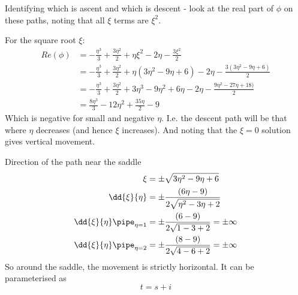 \documentclass{X:/Documents/Coding/Latex/myassignment}
\begin{document}
\begin{enumerate}
\begin{enumerate}
		Identifying which is ascent and which is descent - look at the real part of $\phi$ on these paths, noting that all $\xi$ terms are $\xi^2$. 

		For the square root $\xi$:
		\begin{align*}
			Re(\phi) &= -\frac{\eta ^3}{3}+\frac{3\eta ^2}{2}+\eta\xi^2-2\eta -\frac{3\xi ^2}{2}\\
			&=-\frac{\eta^3}{3} + \frac{3\eta^2}{2} + \eta\left(3\eta^2-9\eta + 6\right) - 2\eta - \frac{3(3\eta^2-9\eta + 6)}{2}\\
			&=-\frac{\eta^3}{3} + \frac{3\eta^2}{2} + 3\eta^3-9\eta^2 + 6\eta - 2\eta - \frac{9\eta^2-27\eta + 18)}{2}\\
			&=\frac{8\eta^3}{3} - 12\eta^2 + \frac{35\eta}{2} - 9
		\end{align*}
		Which is negative for small and negative $\eta$. I.e. the descent path will be that where $\eta$ decreases (and hence $\xi$ increases). 
		And noting that the $\xi = 0$ solution gives vertical movement. 

		Direction of the path near the saddle
		\begin{align*}
			\xi &= \pm\sqrt{3\eta^2 - 9\eta + 6 }\\
			\dd{\xi}{\eta} &= \pm\frac{\left(6\eta -9\right)}{2\sqrt{\eta ^2-3\eta +2}}\\
			\dd{\xi}{\eta}\pipe_{\eta = 1} &= \pm\frac{\left(6 -9\right)}{2\sqrt{1-3 +2}} = \pm\infty\\
			\dd{\xi}{\eta}\pipe_{\eta = 2} &= \pm\frac{\left(8 -9\right)}{2\sqrt{4-6 +2}} = \pm\infty\\
		\end{align*}
		So around the saddle, the movement is strictly horizontal. It can be parameterised as 
		\[t =s + i \]


		


\end{enumerate}
\end{enumerate}
\end{document}
